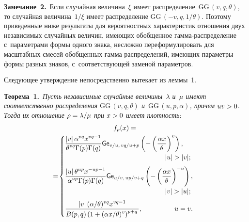 \begin{multicols}{2}
\smallskip

\noindent
\textbf{Замечание~2.}\
Если случайная величина~$\xi$ имеет распределение~$\mathrm{GG}\,(v,q,\theta)$, то случайная 
величина~$1/\xi$ имеет распределение $\mathrm{GG}\,(-v,q,1/\theta)$. Поэтому приведенные 
ниже результаты для вероятностных харак\-те\-ри\-стик отношения двух независимых 
случайных величин, имеющих обобщенное гам\-ма-рас\-пре\-де\-ле\-ние с~параметрами формы 
одного знака, несложно переформулировать для масштабных смесей обобщенных 
гам\-ма-рас\-пре\-де\-ле\-ний, име\-ющих параметры формы разных знаков, 
с~со\-от\-вет\-ст\-ву\-ющей заменой  параметров.


\bigskip

Следующее утверждение непосредственно вытекает из леммы~1.

\bigskip

\noindent
\textbf{Теорема~1.}\
\textit{Пусть независимые случайные величины~$\lambda$ и~$\mu$ имеют соответственно 
распределения $\mathrm{GG}\,(v,q,\theta)$ и~$\mathrm{GG}\,(u,p,\alpha)$, причем $uv\hm>0$. Тогда их 
отношение $\rho\hm=\lambda/\mu$ при $x\hm>0$ имеет плотность}:
\begin{multline*}
f_{\rho}(x) ={}\\
{}=\!
 \begin{cases}
   \displaystyle \fr{\abs{v}\alpha^{vq}x^{vq-
1}}{\theta^{vq}\Gamma(p)\Gamma(q)}{\sf Ge}_{v/u,\, vq/u+p}\left(-\left(\fr{\alpha 
x}{\theta}\right)^{v}\right), &\\[6pt]
&\hspace*{-18mm}|u|>|v|;\\[6pt]
   \displaystyle \fr{\abs{u}\theta^{up}x^{-up-1}}{\alpha^{up}
   \Gamma(p)\Gamma(q)}{\sf Ge}_{u/v,\, up/v+q}\left(-\left(\fr{\alpha 
x}{\theta}\right)^{-u}\right), &\\[6pt]
&\hspace*{-18mm}|v|>|u|;\\[6pt]
   \displaystyle \fr{\abs{v}(\alpha/\theta)^{vq}x^{vq-1}}{B(p,q)
   \left(1+(\alpha x/\theta)^{v}\right)^{p+q}}, &\hspace*{-13mm}u = v.
 \end{cases}
\end{multline*}



\end{multicols}
